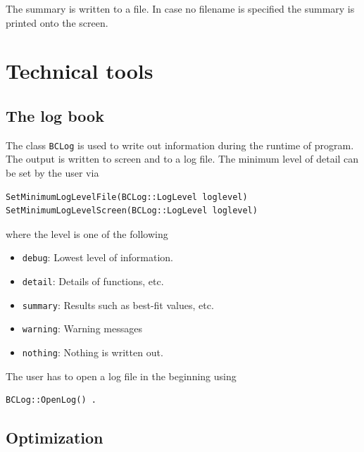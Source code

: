 \documentclass[11pt, a4paper]{article}
\begin{document}
\noindent 
The summary is written to a file. In case no filename is specified the
summary is printed onto the screen. 


\section{Technical tools} 
\label{section:tools} 


\subsection{The log book} 

The class \verb|BCLog| is used to write out information during the
runtime of program. The output is written to screen and to a log
file. The minimum level of detail can be set by the user via
%
\begin{verbatim} 
SetMinimumLogLevelFile(BCLog::LogLevel loglevel)
SetMinimumLogLevelScreen(BCLog::LogLevel loglevel)
\end{verbatim} 

\noindent 
where the level is one of the following 
%
\begin{itemize} 
\item \verb|debug|: Lowest level of information. 
\item \verb|detail|: Details of functions, etc. 
\item \verb|summary|: Results such as best-fit values, etc. 
\item \verb|warning|: Warning messages 
\item \verb|nothing|: Nothing is written out. 
\end{itemize} 

The user has to open a log file in the beginning using 
%
\begin{verbatim} 
BCLog::OpenLog() . 
\end{verbatim} 


\subsection{Optimization} 
\label{section:optimization} 
\end{document}
